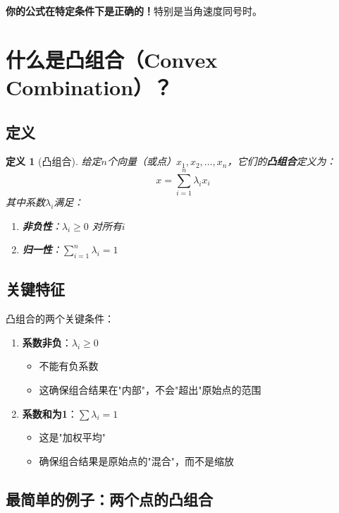 \documentclass[12pt,a4paper]{article}
\newtheorem{definition}{定义}
\begin{document}
\textbf{你的公式在特定条件下是正确的！}特别是当角速度同号时。

\section{什么是凸组合（Convex Combination）？}

\subsection{定义}

\begin{definition}[凸组合]
给定$n$个向量（或点）$x_1, x_2, \ldots, x_n$，它们的\textbf{凸组合}定义为：
\begin{equation}
x = \sum_{i=1}^n \lambda_i x_i
\end{equation}
其中系数$\lambda_i$满足：
\begin{enumerate}
\item \textbf{非负性}：$\lambda_i \geq 0$ 对所有$i$
\item \textbf{归一性}：$\sum_{i=1}^n \lambda_i = 1$
\end{enumerate}
\end{definition}

\subsection{关键特征}

凸组合的两个关键条件：

\begin{enumerate}
\item \textbf{系数非负}：$\lambda_i \geq 0$
  \begin{itemize}
  \item 不能有负系数
  \item 这确保组合结果在"内部"，不会"超出"原始点的范围
  \end{itemize}

\item \textbf{系数和为1}：$\sum \lambda_i = 1$
  \begin{itemize}
  \item 这是"加权平均"
  \item 确保组合结果是原始点的"混合"，而不是缩放
  \end{itemize}
\end{enumerate}

\subsection{最简单的例子：两个点的凸组合}
\end{document}
